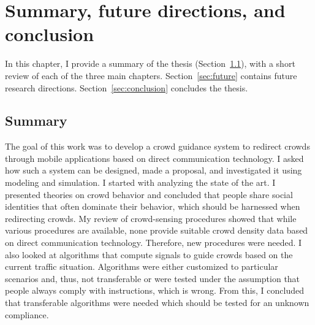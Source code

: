 

\chapter{Summary, future directions, and conclusion}

In this chapter, I provide a summary of the thesis (Section~\ref{sec:summary}), with a short review of each of the three main chapters. Section~\ref{sec:future} contains future research directions. Section~\ref{sec:conclusion} concludes the thesis.


\section{Summary}
\label{sec:summary}

The goal of this work was to develop a crowd guidance system to redirect crowds through mobile applications based on direct communication technology. I asked how such a system can be designed, made a proposal, and investigated it using modeling and simulation. 
%
I started with analyzing the state of the art. I presented theories on crowd behavior and concluded that people share social identities that often dominate their behavior, which should be harnessed when redirecting crowds. 
My review of crowd-sensing procedures showed that while various procedures are available, none provide suitable crowd density data based on direct communication technology. Therefore, new procedures were needed. I also looked at algorithms that compute signals to guide crowds based on the current traffic situation. Algorithms were either customized to particular scenarios and, thus, not transferable or were tested under the assumption that people always comply with instructions, which is wrong. From this, I concluded that transferable algorithms were needed which should be tested for an unknown compliance.

